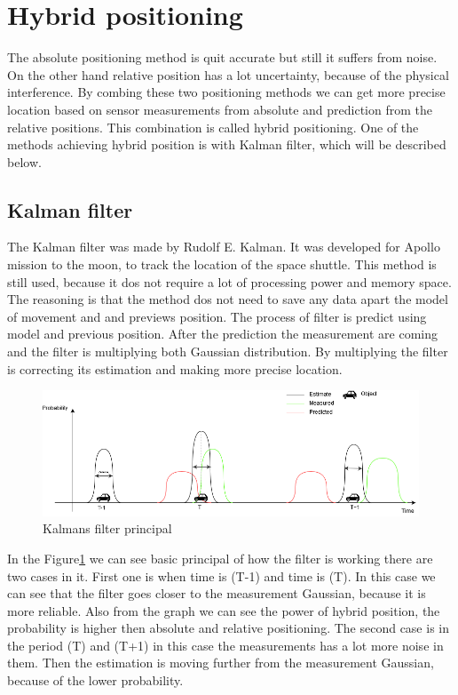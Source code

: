 
\section{Hybrid positioning}

The absolute positioning method is quit accurate but still it suffers from noise. On the other hand relative position has a lot uncertainty, because of the physical interference. By combing these two positioning methods we can get more precise location based on sensor measurements from absolute and prediction from the relative positions. This combination is called hybrid positioning. One of the methods achieving hybrid position is with Kalman filter, which will be described below.

\subsection{Kalman filter}

The Kalman filter was made by Rudolf E. Kalman. It was developed for Apollo mission to the moon, to track the location of the space shuttle. This method is still used, because it dos not require a lot of processing power and memory space. The reasoning is that the method dos not need to save any data apart the model of movement and and previews position. The process of filter is predict using model and previous position. After the prediction the measurement are coming and the filter is multiplying both Gaussian distribution. By multiplying the filter is correcting its estimation and making more precise location.

	\begin{figure}[H]
	\centering
	\includegraphics[width=0.7\linewidth]{positioning/positioning/DiagramKalman}
	\caption{Kalmans filter principal}
	\label{fig:Kalmanfilter}
	\end{figure}

In the Figure\ref{fig:Kalmanfilter} we can see basic principal of how the filter is working there are two cases in it. First one is when time is (T-1) and time is (T). In this case we can see that the filter goes closer to the measurement Gaussian, because it is more reliable. Also from the graph we can see the power of hybrid position, the probability is higher then absolute and relative positioning. The second case is in the period (T) and (T+1) in this case the measurements has a lot more noise in them. Then the estimation is moving further from the measurement Gaussian, because of the lower probability. 